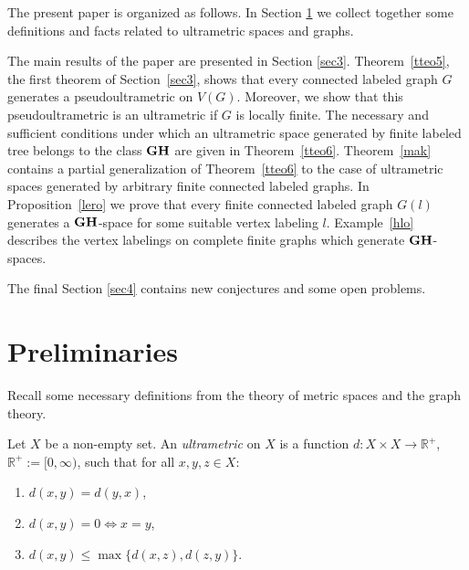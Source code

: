 \documentclass[pdflatex,sn-mathphys-num]{sn-jnl}%
\theoremstyle{thmstyleone}%
\theoremstyle{thmstyletwo}%
\theoremstyle{thmstylethree}%
\theoremstyle{thmstyletwo}%
\theoremstyle{thmstylethree}%
\begin{document}
The present paper is organized as follows. In Section \ref{sec2} we collect together some definitions and facts related to ultrametric spaces and graphs. 

The main results of the paper are presented in Section \ref{sec3}.
Theorem~\ref{tteo5}, the first theorem of Section~\ref{sec3}, shows that every connected labeled graph $G$ generates a pseudoultrametric on $V(G)$. Moreover, we show that this pseudoultrametric is an ultrametric if $G$ is locally finite. The necessary and sufficient conditions under which an ultrametric space generated by finite labeled tree belongs to the class $\bf GH$ are given in Theorem~\ref{tteo6}.
Theorem~\ref{mak} contains a partial generalization of Theorem~\ref{tteo6} to the case of ultrametric spaces generated by arbitrary finite connected labeled graphs. In Proposition~\ref{lero} we prove that every finite connected labeled graph $G(l)$ 
generates a $\bf GH$-space for 
 some suitable vertex labeling $l$.
Example~\ref{hlo} describes the vertex labelings on complete finite   graphs  which generate $\bf GH$-spaces.

The final Section \ref{sec4} contains new conjectures and some open problems.






















\section{Preliminaries}\label{sec2}



Recall some necessary definitions from the theory of metric spaces and the graph theory. 

Let $X$ be a non-empty set. An {\it ultrametric} on  $X$ is a function $d : X \times X \to \mathbb{R}^+$, $\mathbb{R}^+ := [0,\infty)$, such that for all $x,y,z \in X$:
\begin{enumerate}
\item[{\it(i)}] $d(x,y)=d(y,x)$,
\item[{\it(ii)}]  $d(x,y)=0 \iff x=y$,
\item[{\it(iii)}]  $d(x,y)\le \max\{d(x,z),d(z,y)\}$.
\end{enumerate}
\end{document}
